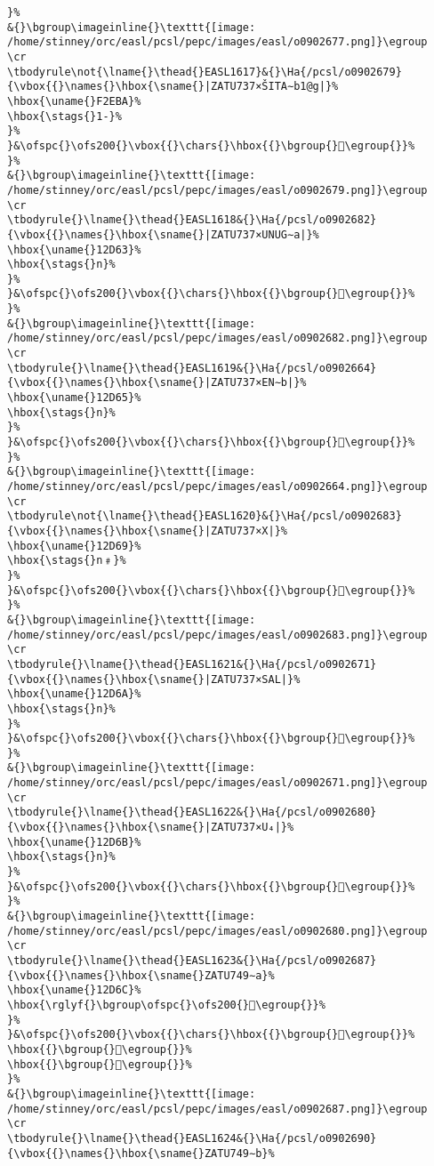 \begin{verbatim}
}%
&{}\bgroup\imageinline{}\texttt{[image: /home/stinney/orc/easl/pcsl/pepc/images/easl/o0902677.png]}\egroup
\cr
\tbodyrule\not{\lname{}\thead{}EASL1617}&{}\Ha{/pcsl/o0902679}{\vbox{{}\names{}\hbox{\sname{}|ZATU737×ŠITA∼b1@g|}%
\hbox{\uname{}F2EBA}%
\hbox{\stags{}1-}%
}%
}&\ofspc{}\ofs200{}\vbox{{}\chars{}\hbox{{}\bgroup{}󲺺\egroup{}}%
}%
&{}\bgroup\imageinline{}\texttt{[image: /home/stinney/orc/easl/pcsl/pepc/images/easl/o0902679.png]}\egroup
\cr
\tbodyrule{}\lname{}\thead{}EASL1618&{}\Ha{/pcsl/o0902682}{\vbox{{}\names{}\hbox{\sname{}|ZATU737×UNUG∼a|}%
\hbox{\uname{}12D63}%
\hbox{\stags{}n}%
}%
}&\ofspc{}\ofs200{}\vbox{{}\chars{}\hbox{{}\bgroup{}𒵣\egroup{}}%
}%
&{}\bgroup\imageinline{}\texttt{[image: /home/stinney/orc/easl/pcsl/pepc/images/easl/o0902682.png]}\egroup
\cr
\tbodyrule{}\lname{}\thead{}EASL1619&{}\Ha{/pcsl/o0902664}{\vbox{{}\names{}\hbox{\sname{}|ZATU737×EN∼b|}%
\hbox{\uname{}12D65}%
\hbox{\stags{}n}%
}%
}&\ofspc{}\ofs200{}\vbox{{}\chars{}\hbox{{}\bgroup{}𒵥\egroup{}}%
}%
&{}\bgroup\imageinline{}\texttt{[image: /home/stinney/orc/easl/pcsl/pepc/images/easl/o0902664.png]}\egroup
\cr
\tbodyrule\not{\lname{}\thead{}EASL1620}&{}\Ha{/pcsl/o0902683}{\vbox{{}\names{}\hbox{\sname{}|ZATU737×X|}%
\hbox{\uname{}12D69}%
\hbox{\stags{}n﹟}%
}%
}&\ofspc{}\ofs200{}\vbox{{}\chars{}\hbox{{}\bgroup{}𒵩\egroup{}}%
}%
&{}\bgroup\imageinline{}\texttt{[image: /home/stinney/orc/easl/pcsl/pepc/images/easl/o0902683.png]}\egroup
\cr
\tbodyrule{}\lname{}\thead{}EASL1621&{}\Ha{/pcsl/o0902671}{\vbox{{}\names{}\hbox{\sname{}|ZATU737×SAL|}%
\hbox{\uname{}12D6A}%
\hbox{\stags{}n}%
}%
}&\ofspc{}\ofs200{}\vbox{{}\chars{}\hbox{{}\bgroup{}𒵪\egroup{}}%
}%
&{}\bgroup\imageinline{}\texttt{[image: /home/stinney/orc/easl/pcsl/pepc/images/easl/o0902671.png]}\egroup
\cr
\tbodyrule{}\lname{}\thead{}EASL1622&{}\Ha{/pcsl/o0902680}{\vbox{{}\names{}\hbox{\sname{}|ZATU737×U₄|}%
\hbox{\uname{}12D6B}%
\hbox{\stags{}n}%
}%
}&\ofspc{}\ofs200{}\vbox{{}\chars{}\hbox{{}\bgroup{}𒵫\egroup{}}%
}%
&{}\bgroup\imageinline{}\texttt{[image: /home/stinney/orc/easl/pcsl/pepc/images/easl/o0902680.png]}\egroup
\cr
\tbodyrule{}\lname{}\thead{}EASL1623&{}\Ha{/pcsl/o0902687}{\vbox{{}\names{}\hbox{\sname{}ZATU749∼a}%
\hbox{\uname{}12D6C}%
\hbox{\rglyf{}\bgroup\ofspc{}\ofs200{}𒵬\egroup{}}%
}%
}&\ofspc{}\ofs200{}\vbox{{}\chars{}\hbox{{}\bgroup{}𒵬\egroup{}}%
\hbox{{}\bgroup{}𒵭\egroup{}}%
\hbox{{}\bgroup{}𒵮\egroup{}}%
}%
&{}\bgroup\imageinline{}\texttt{[image: /home/stinney/orc/easl/pcsl/pepc/images/easl/o0902687.png]}\egroup
\cr
\tbodyrule{}\lname{}\thead{}EASL1624&{}\Ha{/pcsl/o0902690}{\vbox{{}\names{}\hbox{\sname{}ZATU749∼b}%

\end{verbatim}
